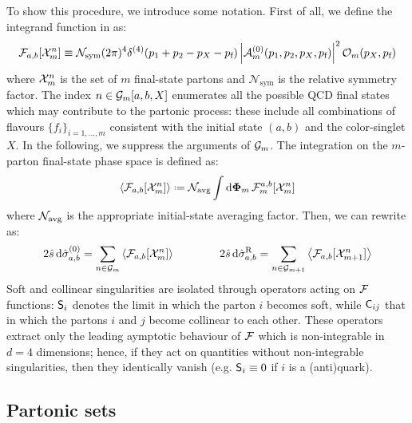 To show this procedure, we introduce some notation\footnotemark. First of all, we define the integrand function in  as:
\begin{equation}
  \mathcal{F}_{a,b}[\mathcal{X}^{n}_{m}] \equiv \mathcal{N}_\text{sym} (2\pi)^4 \delta^{(4)}(p_1 + p_2 - p_X - p_\text{f}) \left\lvert\mathcal{A}_m^{(0)}(p_1, p_2, p_X, p_\text{f})\right\rvert^2 \mathcal{O}_m(p_X, p_\text{f})
\end{equation}
where $ \mathcal{X}^{n}_{m} $ is the set of $ m $ final-state partons and $ \mathcal{N}_\text{sym} $ is the relative symmetry factor. The index $ n \in \mathcal{G}_m[a,b,X] $ enumerates all the possible QCD final states which may contribute to the partonic process: these include all combinations of flavours $ \{f_i\}_{i = 1,\dots,m} $ consistent with the initial state $ (a,b) $ and the color-singlet $ X $. In the following, we suppress the arguments of $ \mathcal{G}_m $. The integration on the $ m $-parton final-state phase space is defined as:
\begin{equation}
  \ips{\flm_{a,b}[\fs{n}{m}]} \defeq \navg \int \lps_m \, \flm_m^{a,b}[\fs{n}{m}]
\end{equation}
where $ \mathcal{N}_\text{avg} $ is the appropriate initial-state averaging factor. Then, we can rewrite  as:
\begin{equation}
  2\hat{s}\, \mathrm{d}\hat{\sigma}_{a,b}^{(0)} = \sum_{n \in \mathcal{G}_m} \left\langle \mathcal{F}_{a,b}[\mathcal{X}^{n}_{m}] \right\rangle
  \qquad \qquad
  2\hat{s}\, \mathrm{d}\hat{\sigma}_{a,b}^\text{R} = \sum_{n \in \mathcal{G}_{m+1}} \left\langle \mathcal{F}_{a,b}[\mathcal{X}^{n}_{m+1}] \right\rangle
  \label{eq:lo-real}
\end{equation}
Soft and collinear singularities are isolated through operators acting on $ \mathcal{F} $ functions: $ \mathsf{S}_i $ denotes the limit in which the parton $ i $ becomes soft, while $ \mathsf{C}_{ij} $ that in which the partons $ i $ and $ j $ become collinear to each other. These operators extract only the leading aymptotic behaviour of $ \mathcal{F} $ which is non-integrable in $ d = 4 $ dimensions; hence, if they act on quantities without non-integrable singularities, then they identically vanish (e.g. $ \mathsf{S}_i \equiv 0 $ if $ i $ is a (anti)quark).


\subsection{Partonic sets}

